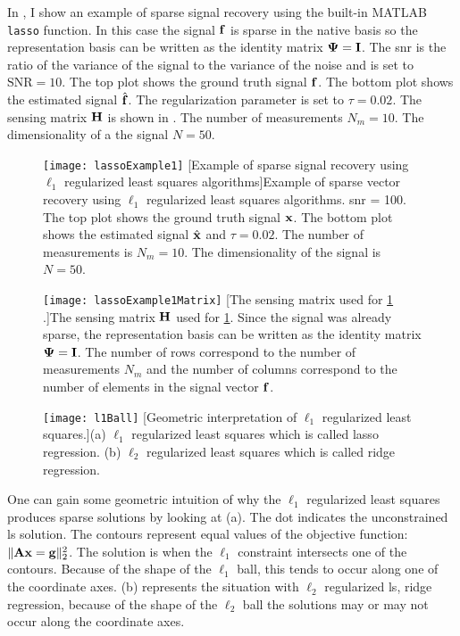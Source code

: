 In , I show an example of sparse signal recovery using the built-in MATLAB \texttt{lasso} function. In this case the signal $\mathbf{f}$ is sparse in the native basis so the representation basis can be written as the identity matrix $\mathbf{\Psi} = \mathbf{I}$. The \gls{snr} is the ratio of the variance of the signal to the variance of the noise and is set to $\text{SNR} = 10$. The top plot shows the ground truth signal $\mathbf{f}$. The bottom plot shows the estimated signal $\hat{ \mathbf{f} }$. The regularization parameter is set to $\tau = 0.02$. The sensing matrix $\mathbf{H}$ is shown in . The number of measurements $N_m = 10$. The dimensionality of a the signal $N = 50$.

\begin{figure}
	\centering
	\texttt{[image: lassoExample1]}
	[Example of sparse signal recovery using $\ell_1$ regularized least squares algorithms]{Example of sparse vector recovery using $\ell_1$ regularized least squares algorithms. \gls{snr} = 100. The top plot shows the ground truth signal $\mathbf{x}$. The bottom plot shows the estimated signal $\hat{ \mathbf{x} }$ and $\tau = 0.02$. The number of measurements is $N_m = 10$. The dimensionality of the signal is $N = 50$. }
	\label{fig:lassoExample1}
\end{figure}

\begin{figure}
	\centering
	\texttt{[image: lassoExample1Matrix]}
	[The sensing matrix used for \cref{fig:lassoExample1} .]{The sensing matrix $\mathbf{H}$ used for \cref{fig:lassoExample1}. Since the signal was already sparse, the representation basis can be written as the identity matrix $\mathbf{\Psi} = \mathbf{I}$. The number of rows correspond to the number of measurements $N_m$ and the number of columns correspond to the number of elements in the signal vector $\mathbf{f}$. }
	\label{fig:lassoExample1Matrix}
\end{figure}

%
\begin{figure}
	\texttt{[image: l1Ball]}
	[Geometric interpretation of $\ell_1$ regularized least squares.]{(a) $\ell_1$ regularized least squares which is called \gls{lasso} regression. (b) $\ell_2$ regularized least squares which is called ridge regression.}
	\label{fig:l1Ball}
\end{figure}

One can gain some geometric intuition of why the $\ell_1$ regularized least squares produces sparse solutions by looking at (a). The dot indicates the unconstrained \gls{ls} solution. The contours represent equal values of the objective function: $\| \mathbf{Ax} = \mathbf{g} \|_{2}^{2}$. The solution is when the $\ell_1$ constraint intersects one of the contours. Because of the shape of the $\ell_1$ ball, this tends to occur along one of the coordinate axes. (b) represents the situation with $\ell_2$ regularized \gls{ls}, ridge regression, because of the shape of the $\ell_2$ ball the solutions may or may not occur along the coordinate axes.


